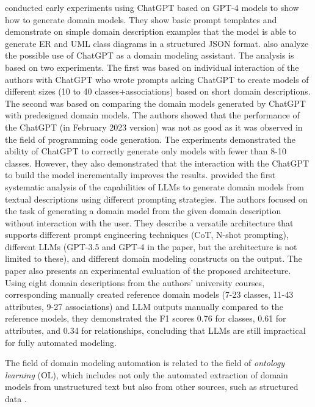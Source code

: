 \citet{Fill2023} conducted early experiments using ChatGPT based on GPT-4 models \cite{Achiam2023} to show how to generate domain models. They show basic prompt templates and demonstrate on simple domain description examples that the model is able to generate ER and UML class diagrams in a structured JSON format.
\citet{Camara2023} also analyze the possible use of ChatGPT as a domain modeling assistant. The analysis is based on two experiments.
The first was based on individual interaction of the authors with ChatGPT who wrote prompts asking ChatGPT to create models of different sizes (10 to 40 classes+associations) based on short domain descriptions.
The second was based on comparing the domain models generated by ChatGPT with predesigned domain models. The authors showed that the performance of the ChatGPT (in February 2023 version) was not as good as it was observed in the field of programming code generation. The experiments demonstrated the ability of ChatGPT to correctly generate only models with fewer than 8-10 classes. However, they also demonstrated that the interaction with the ChatGPT to build the model incrementally improves the results.
\citet{Chen2023} provided the first systematic analysis of the capabilities of LLMs to generate domain models from textual descriptions using different prompting strategies. The authors focused on the task of generating a domain model from the given domain description without interaction with the user. They describe a versatile architecture that supports different prompt engineering techniques (CoT, N-shot prompting), different LLMs (GPT-3.5 and GPT-4 in the paper, but the architecture is not limited to these), and different domain modeling constructs on the output.
The paper also presents an experimental evaluation of the proposed architecture. Using eight domain descriptions from the authors' university courses, corresponding manually created reference domain models (7-23 classes, 11-43 attributes, 9-27 associations) and LLM outputs manually compared to the reference models, they demonstrated the F1 scores 0.76 for classes, 0.61 for attributes, and 0.34 for relationships, concluding that LLMs are still impractical for fully automated modeling.

The field of domain modeling automation is related to the field of \emph{ontology learning} (OL)\cite{Konys2019,Khadir2021}, which includes not only the automated extraction of domain models from unstructured text but also from other sources, such as structured data \cite{Lakzaei2021}.


